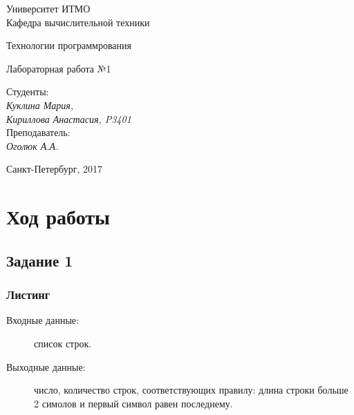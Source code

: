 \documentclass[12pt, a4paper] {ncc}
\begin{document}
\setcounter{figure}{0}
\frenchspacing
\pagestyle{empty}
\begin{center}
                            Университет ИТМО    \\
                        Кафедра вычислительной техники

                    Технологии программрования
\end{center}
\begin{center}
                            Лабораторная работа №1\\
\end{center}
\begin{flushright}
                                    Студенты:\\
                                    {\it Куклина Мария,}\\
                                    {\it Кириллова Анастасия, P3401}\\
                                    Преподаватель: \\
                                    {\it Оголюк А.А.}
\end{flushright}
\begin{center}
                             Санкт-Петербург, 2017
\end{center}
\newpage

\section{Ход работы}
    \subsection{Задание 1}
        \subsubsection{Листинг}
        \begin{description}
            \item[Входные данные:] список строк.
            \item[Выходные данные:] число, количество строк, соответствующих правилу:
                 длина строки больше 2 симолов и первый символ равен последнему.
        \end{description}
\end{document}
